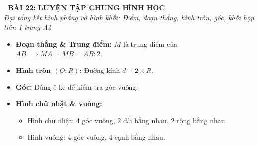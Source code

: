 \documentclass[12pt,a4paper]{article}
\begin{document}
\begin{tcolorbox}[
  enhanced,
  colback=teal!8!white,
  colframe=teal!70!black,
  arc=3mm, boxrule=1.2pt,
  left=3mm, right=3mm, top=2mm, bottom=2mm,
  halign=center
]
  {\LARGE\bfseries\color{teal!90!black}\faBookmark\ BÀI 22: LUYỆN TẬP CHUNG HÌNH HỌC}\\[1mm]
  {\itshape\footnotesize\color{black!75} Đại tổng kết hình phẳng và hình khối: Điểm, đoạn thẳng, hình tròn, góc, khối hộp trên 1 trang A4}
\end{tcolorbox}

\vspace{-2mm}

\noindent
\begin{minipage}[t]{0.49\textwidth}\vspace{0pt}
\begin{tcolorbox}[
  enhanced,
  colback=blue!4!white,
  colframe=blue!75!black,
  arc=2mm, boxrule=0.8pt,
  left=2mm, right=2mm, top=1.8mm, bottom=1.8mm,
  title={\footnotesize\bfseries\color{white}\faCheckSquare\ 1. Mạch Hình học phẳng}
]
{\footnotesize
\begin{itemize}\setlength{\itemsep}{1pt}\setlength{\leftskip}{-2.5mm}
  \item \textbf{Đoạn thẳng \& Trung điểm:} $M$ là trung điểm của $AB \implies MA = MB = AB : 2$.
  \item \textbf{Hình tròn $(O; R)$:} Đường kính $d = 2 \times R$.
  \item \textbf{Góc:} Dùng ê-ke để kiểm tra góc vuông.
  \item \textbf{Hình chữ nhật \& vuông:}
  \begin{itemize}\setlength{\itemsep}{0.5pt}\setlength{\leftskip}{-2.5mm}
    \item Hình chữ nhật: $4$ góc vuông, $2$ dài bằng nhau, $2$ rộng bằng nhau.
    \item Hình vuông: $4$ góc vuông, $4$ cạnh bằng nhau.
  \end{itemize}
\end{itemize}
}
\end{tcolorbox}
\end{minipage}
\hfill
\end{document}
